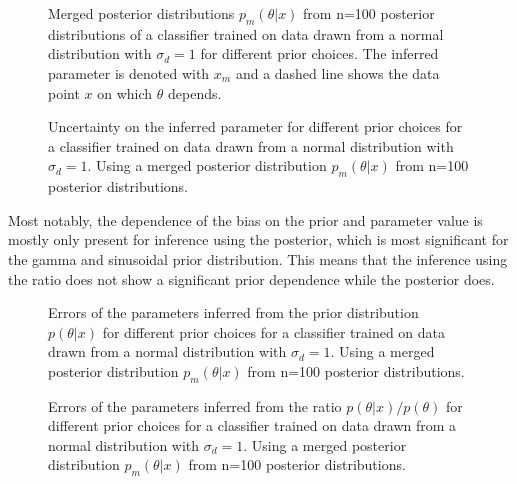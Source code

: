 \documentclass{article}
\begin{document}
\begin{figure}[ht]
    \centering
    
    \caption{Merged posterior distributions $p_m(\theta|x)$ from n=100 posterior distributions of a classifier trained on data drawn from a normal distribution with $\sigma_d=1$ for different prior choices. The inferred parameter is denoted with $x_m$ and a dashed line shows the data point $x$ on which $\theta$ depends.}
    \label{fig:prior_per_parameter_correct_1e0}
\end{figure}
\begin{figure}[ht]
    \centering
    
    \caption{Uncertainty on the inferred parameter for different prior choices for a classifier trained on data drawn from a normal distribution with $\sigma_d=1$. Using a merged posterior distribution $p_m(\theta|x)$ from n=100 posterior distributions.}
    \label{fig:errorbars_correct_1e0}
\end{figure}

\FloatBarrier


Most notably, the dependence of the bias on the prior and parameter value is mostly only present for inference using the posterior, which is most significant for the gamma and sinusoidal prior distribution.
This means that the inference using the ratio does not show a significant prior dependence while the posterior does.

\begin{figure}[ht]
    \centering
    
    \caption{Errors of the parameters inferred from the prior distribution $p(\theta|x)$ for different prior choices for a classifier trained on data drawn from a normal distribution with $\sigma_d=1$. Using a merged posterior distribution $p_m(\theta|x)$ from n=100 posterior distributions.}
    \label{fig:correct_error_and_hpd_width_std1e0}
\end{figure}
\begin{figure}[ht]
    \centering
    
    \caption{Errors of the parameters inferred from the ratio $p(\theta|x)/p(\theta)$ for different prior choices for a classifier trained on data drawn from a normal distribution with $\sigma_d=1$. Using a merged posterior distribution $p_m(\theta|x)$ from n=100 posterior distributions.}
    \label{fig:correct_error_and_hpd_width_ratios_std1e0}
\end{figure}
\end{document}
